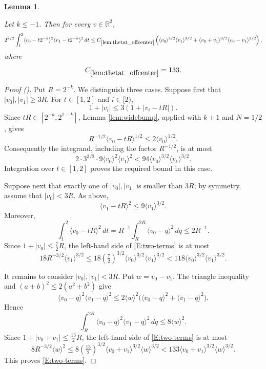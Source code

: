\documentclass[12pt,reqno]{amsart}
\newcommand{\auto}{{({\tiny\faCar})}}
\theoremstyle{plain}
\newtheorem{lemma}[theorem]{Lemma}
\numberwithin{equation}{section}
\theoremstyle{remark}
\newcommand{\uses}[1]{}
\newcommand{\usesdefs}[1]{}
\newcommand{\leanok}{}
\newcommand{\lean}[1]{}
\newcommand{\R}{{\mathbb R}}
\begin{document}
\begin{lemma}\label{lem:thetat_offcenter}\uses{lem:widebump}\usesdefs{bracket bump}
\lean{Auto.thetaTOffcenter}
\leanok
Let $k\le-1$. Then for every $v\in\R^2$,
\begin{equation}\label{E:two-terms}
2^{k/2}\int_1^2
\langle v_0-t2^{-k}\rangle^2
\langle v_1-t2^{-k}\rangle^2\,dt
\le C_{\ref{lem:thetat_offcenter}}
\left(
\langle v_0\rangle^{3/2}\langle v_1\rangle^{3/2}
+
\langle v_0+v_1\rangle^{3/2}\langle v_0-v_1\rangle^{3/2}
\right),
\end{equation}
where
\begin{equation}\label{off center bump constant}
C_{\ref{lem:thetat_offcenter}}=133.
\end{equation}
\end{lemma}
\begin{proof}[Proof \auto]
Put $R=2^{-k}$. We distinguish three cases.
Suppose first that $|v_0|,|v_1|\ge3R$. For $t\in[1,2]$ and $i\in[2)$,
\[
1+|v_i|\le3(1+|v_i-tR|).
\]
Since $tR\in[2^{-k},2^{1-k}]$, Lemma \ref{lem:widebump}, applied with $k+1$ and $N=1/2$, gives
\[
R^{-1/2}\langle v_0-tR\rangle^{1/2}
\le2\langle v_0\rangle^{1/2}.
\]
Consequently the integrand, including the factor $R^{-1/2}$, is at most
\[
2\cdot3^{3/2}\cdot9
\langle v_0\rangle^2\langle v_1\rangle^2
<94\langle v_0\rangle^{3/2}\langle v_1\rangle^{3/2}.
\]
Integration over $t\in[1,2]$ proves the required bound in this case.

Suppose next that exactly one of $|v_0|,|v_1|$ is smaller than $3R$; by symmetry, assume that $|v_0|<3R$. As above,
\[
\langle v_1-tR\rangle^2\le9\langle v_1\rangle^{3/2}.
\]
Moreover,
\[
\int_1^2\langle v_0-tR\rangle^2\,dt
=R^{-1}\int_R^{2R}\langle v_0-q\rangle^2\,dq
\le2R^{-1}.
\]
Since $1+|v_0|\le\frac72R$, the left-hand side of \eqref{E:two-terms} is at most
\[
18R^{-3/2}\langle v_1\rangle^{3/2}
\le18\left(\tfrac72\right)^{3/2}
\langle v_0\rangle^{3/2}\langle v_1\rangle^{3/2}
<118\langle v_0\rangle^{3/2}\langle v_1\rangle^{3/2}.
\]

It remains to consider $|v_0|,|v_1|<3R$. Put $w=v_0-v_1$. The triangle inequality and $(a+b)^2\le2(a^2+b^2)$ give
\[
\langle v_0-q\rangle^2\langle v_1-q\rangle^2
\le2\langle w\rangle^2
\bigl(\langle v_0-q\rangle^2+\langle v_1-q\rangle^2\bigr).
\]
Hence
\[
\int_R^{2R}\langle v_0-q\rangle^2\langle v_1-q\rangle^2\,dq
\le8\langle w\rangle^2.
\]
Since $1+|v_0+v_1|\le\frac{13}{2}R$, the left-hand side of \eqref{E:two-terms} is at most
\[
8R^{-3/2}\langle w\rangle^2
\le8\left(\tfrac{13}{2}\right)^{3/2}
\langle v_0+v_1\rangle^{3/2}\langle w\rangle^{3/2}
<133\langle v_0+v_1\rangle^{3/2}\langle w\rangle^{3/2}.
\]
This proves \eqref{E:two-terms}.
\end{proof}
\end{document}
